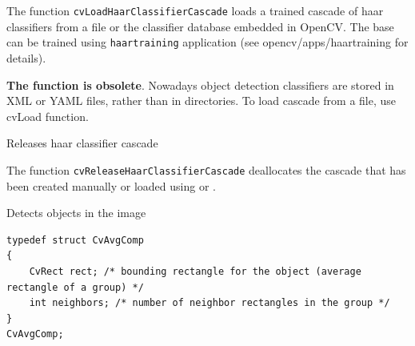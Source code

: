 The function \texttt{cvLoadHaarClassifierCascade} loads a trained cascade
of haar classifiers from a file or the classifier database embedded in
OpenCV. The base can be trained using \texttt{haartraining} application
(see opencv/apps/haartraining for details).

\textbf{The function is obsolete}. Nowadays object detection classifiers are stored in XML or YAML files, rather than in directories. To load cascade from a file, use cvLoad function.

\label{ReleaseHaarClassifierCascade}

Releases haar classifier cascade


\begin{description}
\end{description}

The function \texttt{cvReleaseHaarClassifierCascade} deallocates the cascade that has been created manually or loaded using  or .

\label{HaarDetectObjects}

Detects objects in the image

\begin{lstlisting}
typedef struct CvAvgComp
{
    CvRect rect; /* bounding rectangle for the object (average rectangle of a group) */
    int neighbors; /* number of neighbor rectangles in the group */
}
CvAvgComp;
\end{lstlisting}


